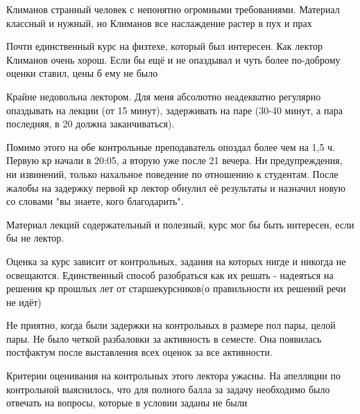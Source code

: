             \begin{commentbox} 
                Климанов странный человек с непонятно огромными требованиями. Материал классный и нужный, но Климанов все наслаждение растер в пух и прах 
            \end{commentbox} 
        
            \begin{commentbox} 
                Почти единственный курс на физтехе, который был интересен. Как лектор Климанов очень хорош. Если бы ещё и не опаздывал и чуть более по-доброму оценки ставил, цены б ему не было 
            \end{commentbox} 
        
            \begin{commentbox} 
                Крайне недовольна лектором. Для меня  абсолютно неадекватно регулярно опаздывать на лекции (от 15 минут), задерживать на паре (30-40 минут, а пара последняя, в 20 должна заканчиваться).

                Помимо этого на обе контрольные преподаватель опоздал более чем на 1,5 ч. Первую кр начали в 20:05, а вторую уже после 21 вечера. Ни предупреждения, ни извинений, только нахальное поведение по отношению к студентам. После жалобы на задержку первой кр лектор обнулил её результаты и назначил новую со словами "вы знаете, кого благодарить".

                Материал лекций содержательный и полезный, курс мог бы быть интересен, если бы не лектор. 
            \end{commentbox} 
        
            \begin{commentbox} 
                Оценка за курс зависит от контрольных, задания на которых нигде и никогда не освещаются. Единственный способ разобраться как их решать - надеяться на решения кр прошлых лет от старшекурсников(о правильности их решений речи не идёт) 
            \end{commentbox} 
        
            \begin{commentbox} 
                Не приятно, когда были задержки на контрольных в размере пол пары, целой пары. Не было четкой разбаловки за активность в семесте. Она появилась постфактум после выставления всех оценок за все активности.
            \end{commentbox} 
        
            \begin{commentbox} 
                Критерии оценивания на контрольных этого лектора ужасны. На апелляции по контрольной выяснилось, что для полного балла за задачу необходимо было отвечать на вопросы, которые в условии заданы не были 
            \end{commentbox} 
        
